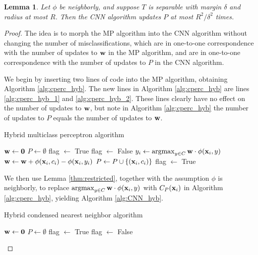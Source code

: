 \documentclass[preprint]{elsarticle}
\newcommand{\argmax}{\operatornamewithlimits{argmax}}
\newtheorem{lemma}{Lemma}
\begin{document}
\begin{lemma}
\label{thm:mainlemma}
Let $\phi$ be neighborly, and suppose $T$ is separable with margin $\delta$ and radius at most $R$. Then the CNN algorithm updates $P$ at most $R^2 / \delta^2$ times.
\end{lemma}
\begin{proof}
The idea is to morph the MP algorithm into the CNN algorithm without changing the number of misclassifications, which are in one-to-one correspondence with the number of updates to ${\bf w}$ in the MP algorithm, and are in one-to-one correspondence with the number of updates to $P$ in the CNN algorithm.

We begin by inserting two lines of code into the MP algorithm, obtaining Algorithm \ref{alg:cperc_hyb}. The new lines in Algorithm \ref{alg:cperc_hyb} are lines \ref{alg:cperc_hyb_1} and \ref{alg:cperc_hyb_2}. These lines clearly have no effect on the number of updates to ${\bf w}$, but note in Algorithm \ref{alg:cperc_hyb} the number of updates to $P$ equals the number of updates to ${\bf w}$.
\begin{algorithm}[h!]
\caption{Hybrid multiclass perceptron algorithm}
\label{alg:cperc_hyb}
\begin{algorithmic}[1]
\STATE ${\bf w} \leftarrow {\bf 0}$
\STATE $P \leftarrow \emptyset$ \label{alg:cperc_hyb_1}
\STATE flag $\leftarrow$ True
\STATE flag $\leftarrow$ False
	\STATE $y_i \gets \argmax_{y \in C} {\bf w} \cdot \phi({\bf x}_i,y)$
		\STATE ${\bf w} \leftarrow {\bf w} + \phi({\bf x}_i,c_i)-\phi({\bf x}_i,y_i)$
		\STATE $P \leftarrow P \cup \{({\bf x}_i , c_i)\}$ \label{alg:cperc_hyb_2}
		\STATE flag $\leftarrow$ True
	\ENDIF
\ENDFOR
\ENDWHILE
\end{algorithmic}
\end{algorithm}
We then use Lemma \ref{thm:restricted}, together with the assumption $\phi$ is neighborly, to replace $\argmax_{y \in C} {\bf w} \cdot \phi({\bf x}_i,y)$ with $C_P({\bf x}_i)$ in Algorithm \ref{alg:cperc_hyb}, yielding Algorithm \ref{alg:CNN_hyb}.
\begin{algorithm}[h!]
\caption{Hybrid condensed nearest neighbor algorithm}
\label{alg:CNN_hyb}
\begin{algorithmic}[1]
\STATE ${\bf w} \leftarrow {\bf 0}$ \label{alg:CNN_hyb_1}
\STATE $P \leftarrow \emptyset$
\STATE flag $\leftarrow$ True
\STATE flag $\leftarrow$ False

\end{algorithmic}
\end{algorithm}
\end{proof}
\end{document}
